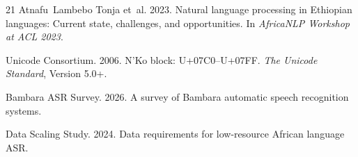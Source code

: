 \documentclass[11pt]{article}
\begin{document}
\begin{thebibliography}{21}
Atnafu~Lambebo Tonja et~al. 2023.
\newblock Natural language processing in {Ethiopian} languages: Current state, challenges, and opportunities.
\newblock In \emph{AfricaNLP Workshop at ACL 2023}.

{Unicode Consortium}. 2006.
\newblock N'Ko block: {U+07C0--U+07FF}.
\newblock \emph{The Unicode Standard}, Version 5.0+.

{Bambara ASR Survey}. 2026.
\newblock A survey of {Bambara} automatic speech recognition systems.

{Data Scaling Study}. 2024.
\newblock Data requirements for low-resource {African} language {ASR}.

\end{thebibliography}
\end{document}
